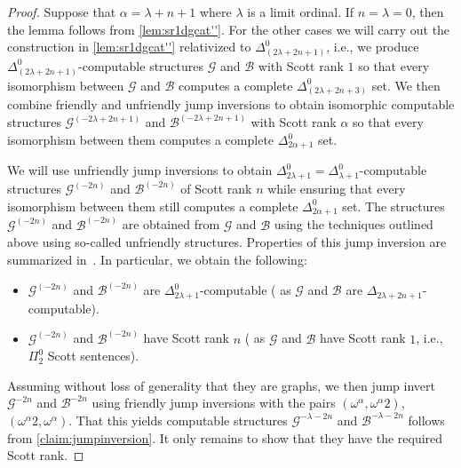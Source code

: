 \documentclass[10pt,a4paper]{amsart}
\newcommand{\G}{\mathcal{G}}
\newcommand\+[1]{\mathcal{#1}}
\renewcommand\*[1]{\mathbf{#1}}
\renewcommand\=[1]{\text{#1}}
\renewcommand\*[1]{\mathbf{#1}}
\newcommand{\B}{\mathcal{B}}
\begin{document}
 \begin{proof}
   Suppose that $\alpha=\lambda+n+1$ where $\lambda$ is a limit ordinal. If $n=\lambda=0$, then the lemma follows from \cref{lem:sr1dgcat''}. For the other cases we will carry out the construction in \cref{lem:sr1dgcat''} relativized to $\Delta^0_{(2\lambda+2n+1)}$, i.e., we produce $\Delta^0_{(2\lambda+2n+1)}$-computable structures $\+G$ and $\B$ with Scott rank $1$ so that every isomorphism between $\+G$ and $\B$ computes a complete $\Delta^0_{(2\lambda+2n+3)}$ set. We then combine friendly and unfriendly jump inversions to obtain isomorphic computable structures $\+G^{(-2\lambda+2n+1)}$ and $\B^{(-2\lambda+2n+1)}$ with Scott rank $\alpha$ so that every isomorphism between them computes a complete $\Delta^0_{2\alpha+1}$ set. 
 
   We will use unfriendly jump inversions to obtain $\Delta^0_{2\lambda+1}=\Delta^0_{\lambda+1}$-computable structures $\+G^{(-2n)}$ and $\B^{(-2n)}$ of Scott rank $n$ while ensuring that every isomorphism between them still computes a complete $\Delta^0_{2\alpha+1}$ set. The structures $\+G^{(-2n)}$ and $\B^{(-2n)}$ are obtained from $\+G$ and $\B$ using the techniques outlined above using so-called unfriendly structures. Properties of this jump inversion are summarized in~\cite[Theorem 4.3]{harrison-trainor2025}. In particular, we obtain the following:
   \begin{itemize}
   \item $\+G^{(-2n)}$ and $\B^{(-2n)}$ are $\Delta^0_{2\lambda+1}$-computable
     (\cite[Theorem 4.3 Item 1]{harrison-trainor2025} as $\G$ and $\B$ are $\Delta_{2\lambda+2n+1}$-computable).
   \item $\+G^{(-2n)}$ and $\B^{(-2n)}$ have Scott rank $n$
     (\cite[Theorem 4.3 Item 4]{harrison-trainor2025} as $\G$ and $\B$ have Scott rank $1$, i.e., $\Pi^0_2$ Scott sentences).
   \end{itemize}
   Assuming without loss of generality that they are graphs, we then jump invert $\+G^{-2n}$ and $\B^{-2n}$ using friendly jump inversions with the pairs $(\omega^\alpha,\omega^\alpha2)$, $(\omega^\alpha2,\omega^\alpha)$. That this yields computable structures $\+G^{-\lambda-2n}$ and $\+B^{-\lambda-2n}$ follows from \cref{claim:jumpinversion}. It only remains to show that they have the required Scott rank.


\end{proof}
\end{document}
